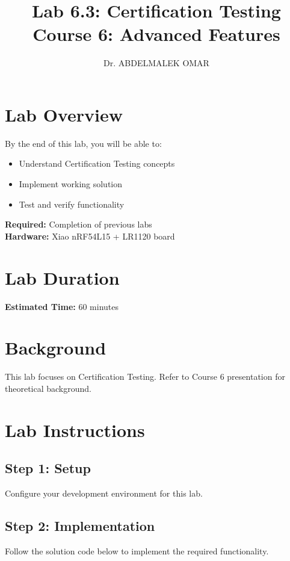 \documentclass[11pt,a4paper]{article}
\title{\textbf{Lab 6.3: Certification Testing}\\
\large Course 6: Advanced Features}
\author{Dr. ABDELMALEK OMAR}
\date{}
\begin{document}
\maketitle
\thispagestyle{fancy}

\section{Lab Overview}

\begin{objectivebox}
By the end of this lab, you will be able to:
\begin{itemize}
    \item Understand Certification Testing concepts
    \item Implement working solution
    \item Test and verify functionality
\end{itemize}
\end{objectivebox}

\begin{prereqbox}
\textbf{Required:} Completion of previous labs\\
\textbf{Hardware:} Xiao nRF54L15 + LR1120 board
\end{prereqbox}

\section{Lab Duration}
\textbf{Estimated Time:} 60 minutes

\section{Background}

This lab focuses on Certification Testing. Refer to Course 6 presentation for theoretical background.

\section{Lab Instructions}

\subsection{Step 1: Setup}
Configure your development environment for this lab.

\subsection{Step 2: Implementation}
Follow the solution code below to implement the required functionality.
\end{document}
